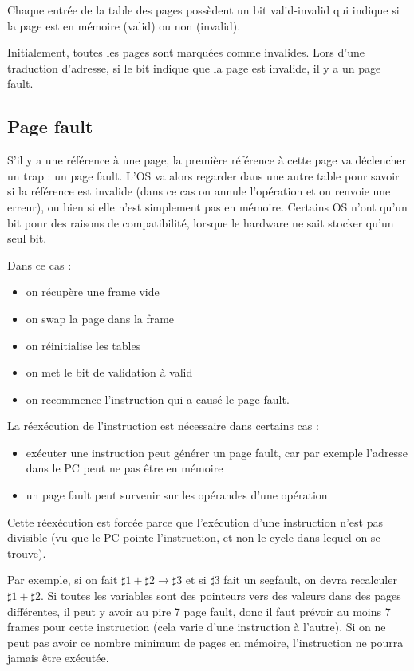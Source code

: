 	Chaque entrée de la table des pages possèdent un bit valid-invalid qui indique si la page est en mémoire (valid) ou non (invalid).
	
	Initialement, toutes les pages sont marquées comme invalides. Lors d'une traduction d'adresse, si le bit indique que la page est invalide, il y a un page fault.
		
	\subsection{Page fault}
	
	S'il y a une référence à une page, la première référence à cette page va déclencher un trap : un page fault. L'OS va alors regarder dans une autre table pour savoir si la référence est invalide (dans ce cas on annule l'opération et on renvoie une erreur), ou bien si elle n'est simplement pas en mémoire. Certains OS n'ont qu'un bit pour des raisons de compatibilité, lorsque le hardware ne sait stocker qu'un seul bit.
	
	Dans ce cas :
	
	\begin{itemize}
		\item on récupère une frame vide
		\item on swap la page dans la frame
		\item on réinitialise les tables
		\item on met le bit de validation à valid
		\item on recommence l'instruction qui a causé le page fault.
	\end{itemize}
	
	La réexécution de l'instruction est nécessaire dans certains cas :
	
	\begin{itemize}
		\item exécuter une instruction peut générer un page fault, car par exemple l'adresse dans le PC peut ne pas être en mémoire
		\item un page fault peut survenir sur les opérandes d'une opération
	\end{itemize}
	
	Cette réexécution est forcée parce que l'exécution d'une instruction n'est pas divisible (vu que le PC pointe l'instruction, et non le cycle dans lequel on se trouve).
	
	Par exemple, si on fait $\sharp 1 + \sharp 2 \rightarrow \sharp 3$ et si $\sharp 3$ fait un segfault, on devra recalculer $\sharp 1 + \sharp 2$. Si toutes les variables sont des pointeurs vers des valeurs dans des pages différentes, il peut y avoir au pire 7 page fault, donc il faut prévoir au moins 7 frames pour cette instruction (cela varie d'une instruction à l'autre). Si on ne peut pas avoir ce nombre minimum de pages en mémoire, l'instruction ne pourra jamais être exécutée.
	
